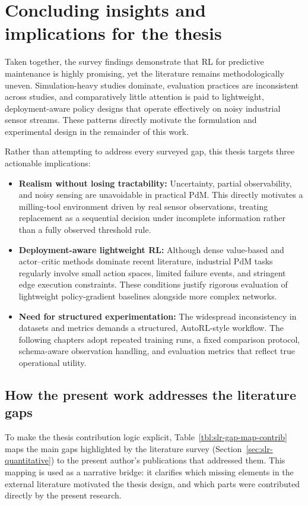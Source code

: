 \documentclass[12pt,oneside]{book}
\begin{document}
\section{Concluding insights and implications for the thesis}
Taken together, the survey findings demonstrate that RL for predictive maintenance is highly promising, yet the literature remains methodologically uneven. Simulation-heavy studies dominate, evaluation practices are inconsistent across studies, and comparatively little attention is paid to lightweight, deployment-aware policy designs that operate effectively on noisy industrial sensor streams. These patterns directly motivate the formulation and experimental design in the remainder of this work.

Rather than attempting to address every surveyed gap, this thesis targets three actionable implications:

\begin{itemize}
    \item \textbf{Realism without losing tractability:} Uncertainty, partial observability, and noisy sensing are unavoidable in practical PdM. This directly motivates a milling-tool environment driven by real sensor observations, treating replacement as a sequential decision under incomplete information rather than a fully observed threshold rule.
    \item \textbf{Deployment-aware lightweight RL:} Although dense value-based and actor--critic methods dominate recent literature, industrial PdM tasks regularly involve small action spaces, limited failure events, and stringent edge execution constraints. These conditions justify rigorous evaluation of lightweight policy-gradient baselines alongside more complex networks.
    \item \textbf{Need for structured experimentation:} The widespread inconsistency in datasets and metrics demands a structured, AutoRL-style workflow. The following chapters adopt repeated training runs, a fixed comparison protocol, schema-aware observation handling, and evaluation metrics that reflect true operational utility.
\end{itemize}

\subsection{How the present work addresses the literature gaps}
To make the thesis contribution logic explicit, Table~\ref{tbl:slr-gap-map-contrib} maps the main gaps highlighted by the literature survey (Section~\ref{sec:slr-quantitative}) to the present author's publications that addressed them. This mapping is used as a narrative bridge: it clarifies which missing elements in the external literature motivated the thesis design, and which parts were contributed directly by the present research.
\end{document}
